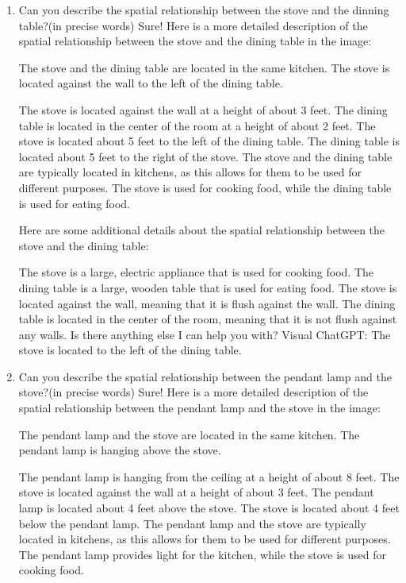 \begin{enumerate}
    \item Can you describe the spatial relationship between the stove and the dinning table?(in precise words)
    \subitem 
    Sure! Here is a more detailed description of the spatial relationship between the stove and the dining table in the image:
    
    The stove and the dining table are located in the same kitchen. The stove is located against the wall to the left of the dining table.
    
    The stove is located against the wall at a height of about 3 feet.
    The dining table is located in the center of the room at a height of about 2 feet.
    The stove is located about 5 feet to the left of the dining table.
    The dining table is located about 5 feet to the right of the stove.
    The stove and the dining table are typically located in kitchens, as this allows for them to be used for different purposes. The stove is used for cooking food, while the dining table is used for eating food.
    
    Here are some additional details about the spatial relationship between the stove and the dining table:
    
    The stove is a large, electric appliance that is used for cooking food.
    The dining table is a large, wooden table that is used for eating food.
    The stove is located against the wall, meaning that it is flush against the wall.
    The dining table is located in the center of the room, meaning that it is not flush against any walls.
    Is there anything else I can help you with?
    \subitem Visual ChatGPT: The stove is located to the left of the dining table.
    \item Can you describe the spatial relationship between the pendant lamp and the stove?(in precise words)
    \subitem 
    Sure! Here is a more detailed description of the spatial relationship between the pendant lamp and the stove in the image:
    
    The pendant lamp and the stove are located in the same kitchen. The pendant lamp is hanging above the stove.
    
    The pendant lamp is hanging from the ceiling at a height of about 8 feet.
    The stove is located against the wall at a height of about 3 feet.
    The pendant lamp is located about 4 feet above the stove.
    The stove is located about 4 feet below the pendant lamp.
    The pendant lamp and the stove are typically located in kitchens, as this allows for them to be used for different purposes. The pendant lamp provides light for the kitchen, while the stove is used for cooking food.
    

\end{enumerate}
